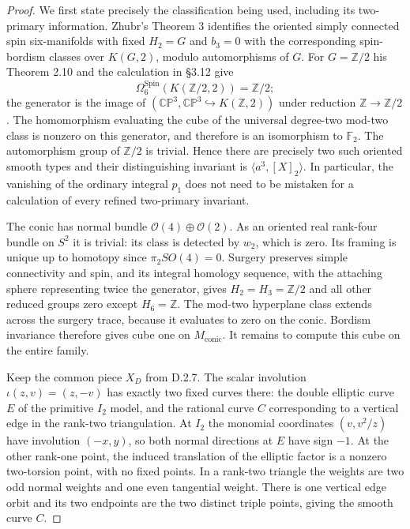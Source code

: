 \begin{proof}
We first state precisely the classification being used, including
its two-primary information. Zhubr's Theorem 3 identifies the
oriented simply connected spin six-manifolds with fixed $H_2=G$
and $b_3=0$ with the corresponding spin-bordism classes over
$K(G,2)$, modulo automorphisms of $G$.
For $G=\mathbb Z/2$ his Theorem 2.10 and the calculation in
\S3.12 give
\[
 \Omega^{\mathrm{Spin}}_6(K(\mathbb Z/2,2))=\mathbb Z/2;
\]
the generator is the image of
$(\mathbb {CP}^3,\mathbb {CP}^3\hookrightarrow
K(\mathbb Z,2))$ under reduction $\mathbb Z\to\mathbb Z/2$
\cite[Theorems 3, 2.10, pp.795,803, and \S3.12, p.807]{manZhubr75}.
The homomorphism evaluating the cube of the universal
degree-two mod-two class is nonzero on this generator, and
therefore is an isomorphism to $\mathbb F_2$.
The automorphism group of $\mathbb Z/2$ is trivial. Hence there
are precisely two such oriented smooth types and their
distinguishing invariant is $\langle a^3,[X]_2\rangle$.
In particular, the vanishing of the ordinary integral $p_1$
does not need to be mistaken for a calculation of every refined
two-primary invariant.

The conic has normal bundle $\mathcal O(4)\oplus\mathcal O(2)$.
As an oriented real rank-four bundle on $S^2$ it is trivial:
its class is detected by $w_2$, which is zero. Its framing is
unique up to homotopy since $\pi_2SO(4)=0$.
Surgery preserves simple connectivity and spin, and its integral
homology sequence, with the attaching sphere representing twice
the generator, gives $H_2=H_3=\mathbb Z/2$ and all other reduced
groups zero except $H_6=\mathbb Z$.
The mod-two hyperplane class extends across the surgery trace,
because it evaluates to zero on the conic. Bordism invariance
therefore gives cube one on $M_{\mathrm{conic}}$.
It remains to compute this cube on the entire family.

Keep the common piece $X_D$ from D.2.7. The scalar involution
$\iota(z,v)=(z,-v)$ has exactly two fixed curves there: the
double elliptic curve $E$ of the primitive $I_2$ model, and the
rational curve $C$ corresponding to a vertical edge in the
rank-two triangulation. At $I_2$ the monomial coordinates
$(v,v^2/z)$ have involution $(-x,y)$, so both normal directions
at $E$ have sign $-1$. At the other rank-one point, the induced
translation of the elliptic factor is a nonzero two-torsion
point, with no fixed points. In a rank-two triangle the weights
are two odd normal weights and one even tangential weight.
There is one vertical edge orbit and its two endpoints are the
two distinct triple points, giving the smooth curve $C$.


\end{proof}
